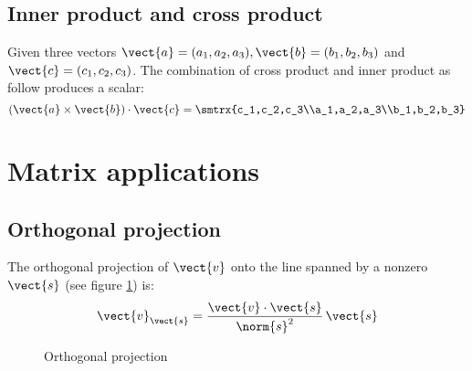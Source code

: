 \subsection{Inner product and cross product}
Given three vectors $\vect{a}=(a_1,a_2,a_3),\vect{b}=(b_1,b_2,b_3)$ and $\vect{c}=(c_1,c_2,c_3)$. The combination of cross product and inner product as follow produces a scalar:
\begin{equation}
\left( \vect{a}\times\vect{b} \right)\cdot\vect{c}=\smtrx{c_1,c_2,c_3\\a_1,a_2,a_3\\b_1,b_2,b_3}
\end{equation}

\section{Matrix applications}
\subsection{Orthogonal projection}
The orthogonal projection of $\vect{v}$ onto the line spanned by a nonzero $\vect{s}$ (see figure \ref{Linalg_projection}) is: 
\[ \vect{v}_{\vect{s}}=\frac{\vect{v}\cdot\vect{s}}{\norm{s}^2} \, \vect{s} \]

\begin{figure}[hbtp]
\caption{Orthogonal projection}
\label{Linalg_projection}
\centering
\end{figure}

